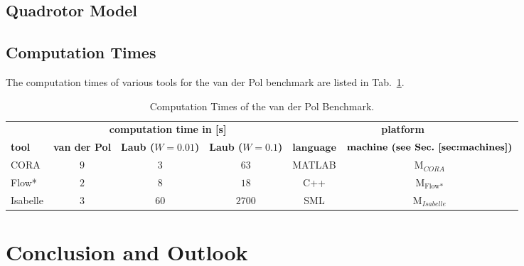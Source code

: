 \documentclass[EPiC]{easychair}
\begin{document}
\subsection{Quadrotor Model}




\subsection{Computation Times}

The computation times of various tools for the van der Pol benchmark are listed in Tab.~\ref{tab:compTimes:vanderpol}.


\begin{table}[h]
	\setlength{\tabcolsep}{4pt}
	\renewcommand{\arraystretch}{1.2}
	\centering
	\caption{Computation Times of the van der Pol Benchmark.}
	\begin{tabular}[c]{lccccc}
	\hline
		 & \multicolumn{3}{c}{\textbf{computation time in [s]}} & \multicolumn{2}{c}{\textbf{platform}} \\ \cmidrule(l){2-4} \cmidrule(l){5-6}
		 \textbf{tool} & \textbf{van der Pol} & \textbf{Laub ($W=0.01$)} & \textbf{Laub ($W=0.1$)} & $\textbf{language}$ & $\textbf{machine (see  Sec.~\ref{sec:machines})}$ \\ \hline
         CORA & $9$ & $3$ & $63$ & MATLAB & M$_{CORA}$ \\
         Flow* & $2$ & $8$ & $18$ & C++ & M$_{\text{Flow*}}$ \\
         Isabelle & $3$ & $60$ & $2700$ & SML & M$_{Isabelle}$ \\
		 \hline
	\end{tabular}
	\label{tab:compTimes:vanderpol}
\end{table}
\fi



\section{Conclusion and Outlook}
\label{sect:conclusion}

\end{document}
